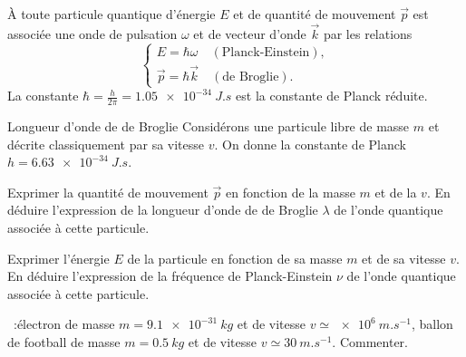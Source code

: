 \documentclass[12pt,fancy]{cours}
\begin{document}
\begin{theorem}\label{form:}
  À toute particule quantique d'énergie $E$ et de quantité de mouvement $\Vec{p}$ est associée une onde de pulsation $\omega$ et de vecteur d'onde $\Vec{k}$ par les relations
  $$
  \begin{cases}
    E=\hbar\omega\quad (\text{Planck-Einstein}),\\
    \Vec{p}=\hbar\Vec{k} \quad (\text{de Broglie}).
  \end{cases}
  $$
  La constante $\hbar = \frac{h}{2\pi} = \SI{1.05e-34}{J.s}$ est la constante de Planck réduite.
\end{theorem}

\begin{exemple}{Longueur d'onde de de Broglie}
  Considérons une particule libre de masse $m$ et décrite classiquement par sa vitesse $v$. On donne la constante de Planck $h = \SI{6.63e-34}{J.s}$.
  \begin{quest}
    \item	Exprimer la quantité de mouvement $\Vec{p}$ en fonction de la masse $m$ et de la $v$. En déduire l'expression de la longueur d'onde de de Broglie $\lambda$ de l'onde quantique associée à cette particule. 
    \item Exprimer l'énergie $E$ de la particule en fonction de sa masse $m$ et de sa vitesse $v$. En déduire l'expression de la fréquence de Planck-Einstein $\nu$ de l'onde quantique associée à cette particule.
    \item \AN~:électron de masse $m = \SI{9.1e-31}{kg}$ et de  vitesse $v \simeq \SI{e6}{m.s^{-1}}$, ballon de football de masse $m= \SI{0.5}{kg}$ et de vitesse $v \simeq \SI{30}{m.s^{-1}}$. Commenter.
  \end{quest}
  

\end{exemple}
\end{document}
